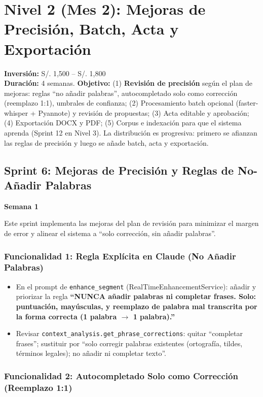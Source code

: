 \documentclass[12pt,a4paper]{report}
\begin{document}
\section{Nivel 2 (Mes 2): Mejoras de Precisión, Batch, Acta y Exportación}

\textbf{Inversión:} S/. 1,500 -- S/. 1,800 \\
\textbf{Duración:} 4 semanas. \textbf{Objetivo:} (1) \textbf{Revisión de precisión} según el plan de mejoras: reglas ``no añadir palabras'', autocompletado solo como corrección (reemplazo 1:1), umbrales de confianza; (2) Procesamiento batch opcional (faster-whisper + Pyannote) y revisión de propuestas; (3) Acta editable y aprobación; (4) Exportación DOCX y PDF; (5) Corpus e indexación para que el sistema aprenda (Sprint 12 en Nivel 3). La distribución es progresiva: primero se afianzan las reglas de precisión y luego se añade batch, acta y exportación.

\subsection{Sprint 6: Mejoras de Precisión y Reglas de No-Añadir Palabras}

\textbf{Semana 1}

Este sprint implementa las mejoras del plan de revisión para minimizar el margen de error y alinear el sistema a ``solo corrección, sin añadir palabras''.

\subsubsection{Funcionalidad 1: Regla Explícita en Claude (No Añadir Palabras)}

\begin{itemize}
    \item En el prompt de \texttt{enhance\_segment} (RealTimeEnhancementService): añadir y priorizar la regla \textbf{``NUNCA añadir palabras ni completar frases. Solo: puntuación, mayúsculas, y reemplazo de palabra mal transcrita por la forma correcta (1 palabra $\to$ 1 palabra).''}
    \item Revisar \texttt{context\_analysis.get\_phrase\_corrections}: quitar ``completar frases''; sustituir por ``solo corregir palabras existentes (ortografía, tildes, términos legales); no añadir ni completar texto''.
\end{itemize}

\subsubsection{Funcionalidad 2: Autocompletado Solo como Corrección (Reemplazo 1:1)}
\end{document}
